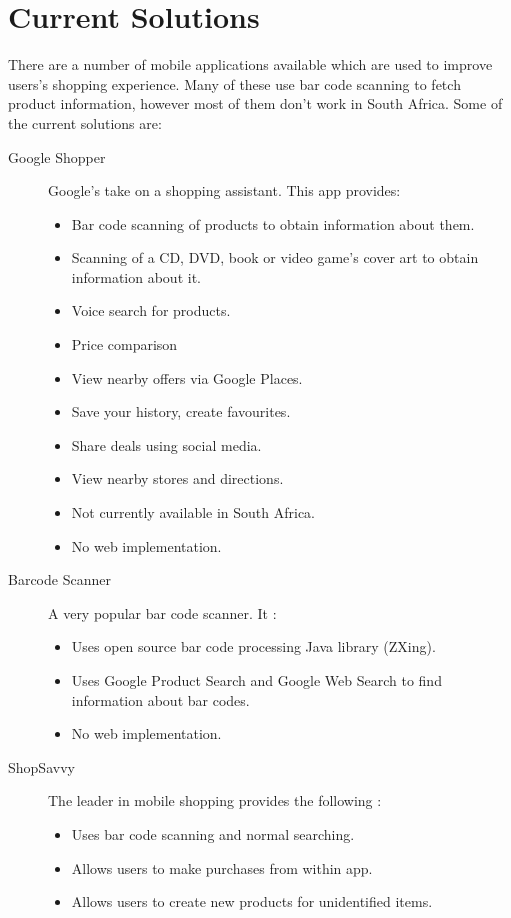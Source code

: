 \section{Current Solutions}

There are a number of mobile applications available which are used to improve users's shopping experience. Many of these use bar code scanning to fetch product information, however most of them don't work in South Africa. Some of the current solutions are:
\begin{description}
\item[Google Shopper~\cite{google}] Google's take on a shopping assistant. This app provides:
\begin{itemize}
\item Bar code scanning of products to obtain information about them.
\item Scanning of a CD, DVD, book or video game's cover art to obtain information about it.
\item Voice search for products.
\item Price comparison
\item View nearby offers via Google Places.
\item Save your history, create favourites.
\item Share deals using social media.
\item View nearby stores and directions.
\item Not currently available in South Africa.
\item No web implementation.
\end{itemize}
\item[Barcode Scanner~\cite{scanner}] A very popular bar code scanner. It :
\begin{itemize}
\item Uses open source bar code processing Java library (ZXing).
\item Uses Google Product Search and Google Web Search to find information about bar codes.
\item No web implementation.
\end{itemize}
\item[ShopSavvy~\cite{shopsavvy}] The leader in mobile shopping provides the following :
\begin{itemize}
\item Uses bar code scanning and normal searching.
\item Allows users to make purchases from within app.
\item Allows users to create new products for unidentified items.

\end{itemize}
\end{description}
